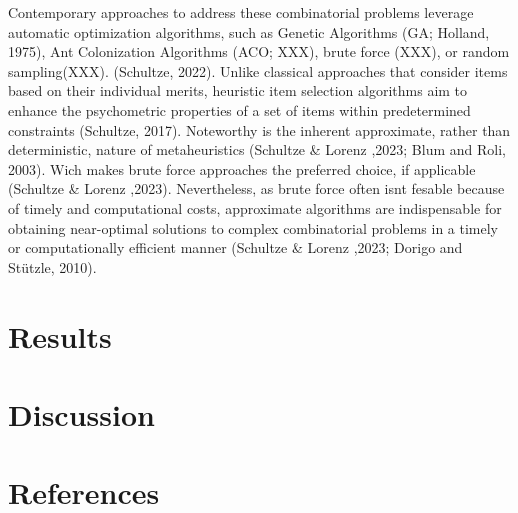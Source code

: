 \documentclass[
  12pt,
  a4paper,
  twoside]{article}
\begin{document}
Contemporary approaches to address these combinatorial problems leverage automatic optimization algorithms, such as Genetic Algorithms (GA; Holland, 1975), Ant Colonization Algorithms (ACO; XXX), brute force (XXX), or random sampling(XXX). (Schultze, 2022).
Unlike classical approaches that consider items based on their individual merits, heuristic item selection algorithms aim to enhance the psychometric properties of a set of items within predetermined constraints (Schultze, 2017).
Noteworthy is the inherent approximate, rather than deterministic, nature of metaheuristics (Schultze \& Lorenz ,2023; Blum and Roli, 2003). Wich makes brute force approaches the preferred choice, if applicable (Schultze \& Lorenz ,2023). Nevertheless, as brute force often isnt fesable because of timely and computational costs, approximate algorithms are indispensable for obtaining near-optimal solutions to complex combinatorial problems in a timely or computationally efficient manner (Schultze \& Lorenz ,2023; Dorigo and Stützle, 2010).

\hypertarget{results-2}{%
\section{Results}\label{results-2}}

\hypertarget{discussion-2}{%
\section{Discussion}\label{discussion-2}}

\hypertarget{references-2}{%
\section*{References}\label{references-2}}
\end{document}
